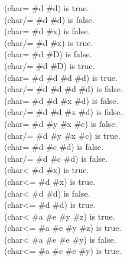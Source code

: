 \begin{defun}[Function]
\begin{lisp}
(char= \#{\Xbackslash}d \#{\Xbackslash}d) {\rm is true.} \\
(char/= \#{\Xbackslash}d \#{\Xbackslash}d) {\rm is false.} \\
(char= \#{\Xbackslash}d \#{\Xbackslash}x) {\rm is false.} \\
(char/= \#{\Xbackslash}d \#{\Xbackslash}x) {\rm is true.} \\
(char= \#{\Xbackslash}d \#{\Xbackslash}D) {\rm is false.} \\
(char/= \#{\Xbackslash}d \#{\Xbackslash}D) {\rm is true.} \\
(char= \#{\Xbackslash}d \#{\Xbackslash}d \#{\Xbackslash}d \#{\Xbackslash}d) {\rm is true.} \\
(char/= \#{\Xbackslash}d \#{\Xbackslash}d \#{\Xbackslash}d \#{\Xbackslash}d) {\rm is false.} \\
(char= \#{\Xbackslash}d \#{\Xbackslash}d \#{\Xbackslash}x \#{\Xbackslash}d) {\rm is false.} \\
(char/= \#{\Xbackslash}d \#{\Xbackslash}d \#{\Xbackslash}x \#{\Xbackslash}d) {\rm is false.} \\
(char= \#{\Xbackslash}d \#{\Xbackslash}y \#{\Xbackslash}x \#{\Xbackslash}c) {\rm is false.} \\
(char/= \#{\Xbackslash}d \#{\Xbackslash}y \#{\Xbackslash}x \#{\Xbackslash}c) {\rm is true.} \\
(char= \#{\Xbackslash}d \#{\Xbackslash}c \#{\Xbackslash}d) {\rm is false.} \\
(char/= \#{\Xbackslash}d \#{\Xbackslash}c \#{\Xbackslash}d) {\rm is false.} \\
(char< \#{\Xbackslash}d \#{\Xbackslash}x) {\rm is true.} \\
(char<= \#{\Xbackslash}d \#{\Xbackslash}x) {\rm is true.} \\
(char< \#{\Xbackslash}d \#{\Xbackslash}d) {\rm is false.} \\
(char<= \#{\Xbackslash}d \#{\Xbackslash}d) {\rm is true.} \\
(char< \#{\Xbackslash}a \#{\Xbackslash}e \#{\Xbackslash}y \#{\Xbackslash}z) {\rm is true.} \\
(char<= \#{\Xbackslash}a \#{\Xbackslash}e \#{\Xbackslash}y \#{\Xbackslash}z) {\rm is true.} \\
(char< \#{\Xbackslash}a \#{\Xbackslash}e \#{\Xbackslash}e \#{\Xbackslash}y) {\rm is false.} \\
(char<= \#{\Xbackslash}a \#{\Xbackslash}e \#{\Xbackslash}e \#{\Xbackslash}y) {\rm is true.} \\

\end{lisp}
\end{defun}
